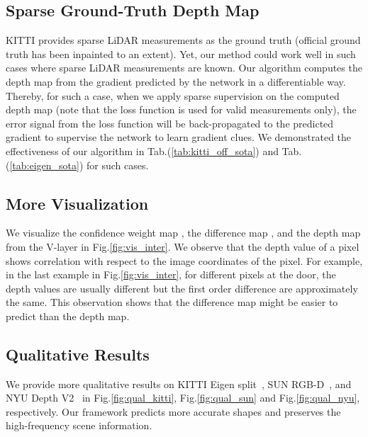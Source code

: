 \documentclass{article} \usepackage{iclr2023_conference, times}
\begin{document}
\subsection{Sparse Ground-Truth Depth Map}
KITTI provides sparse LiDAR measurements as the ground truth (official ground truth has been inpainted to an extent). Yet, our method could work well in such cases where sparse LiDAR measurements are known. Our algorithm computes the depth map from the gradient predicted by the network in a differentiable way. Thereby, for such a case, when we apply sparse supervision on the computed depth map (note that the loss function is used for valid measurements only), the error signal from the loss function will be back-propagated to the predicted gradient to supervise the network to learn gradient clues. We demonstrated the effectiveness of our algorithm in Tab.(\ref{tab:kitti_off_sota}) and Tab.(\ref{tab:eigen_sota}) for such cases.

\subsection{More Visualization}
We visualize the confidence weight map , the difference map , and the depth map  from the V-layer in Fig.\ref{fig:vis_inter}. We observe that the depth value of a pixel shows correlation with respect to the image coordinates of the pixel. For example, in the last example in Fig.\ref{fig:vis_inter}, for different pixels at the door, the depth values are usually different but the first order difference are approximately the same. This observation shows that the difference map might be easier to predict than the depth map. 



\subsection{Qualitative Results}
\label{sec:qual_eigen}
We provide more qualitative results on KITTI Eigen split~\citep{eigen2014depth}, SUN RGB-D~\citep{song2015sun}, and NYU Depth V2~\citep{silberman2012indoor} in Fig.\ref{fig:qual_kitti},  Fig.\ref{fig:qual_sun} and Fig.\ref{fig:qual_nyu}, respectively. Our framework predicts more accurate shapes and preserves the high-frequency scene information.  
\end{document}
